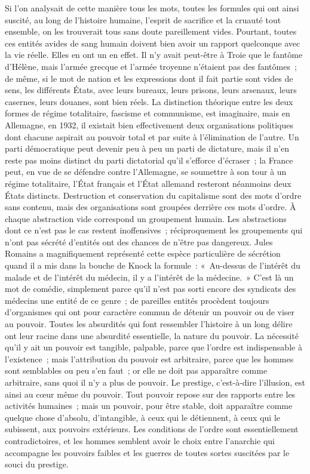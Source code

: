 \documentclass[french,twoside]{book} %
\begin{document}
\noindent Si l'on analysait de cette manière tous les mots, toutes les formules qui ont ainsi suscité, au long de l'histoire humaine, l'esprit de sacrifice et la cruauté tout ensemble, on les trouverait tous sans doute pareillement vides. Pourtant, toutes ces entités avides de sang humain doivent bien avoir un rapport quelconque avec la vie réelle. Elles en ont un en effet. Il n'y avait peut-être à Troie que le fantôme d'Hélène, mais l'armée grecque et l'armée troyenne n'étaient pas des fantômes ; de même, si le mot de nation et les expressions dont il fait partie sont vides de sens, les différents États, avec leurs bureaux, leurs prisons, leurs arsenaux, leurs casernes, leurs douanes, sont bien réels. La distinction théorique entre les deux formes de régime totalitaire, fascisme et communisme, est imaginaire, mais en Allemagne, en 1932, il existait bien effectivement deux organisations politiques dont chacune aspirait au pouvoir total et par suite à l'élimination de l'autre. Un parti démocratique peut devenir peu à peu un parti de dictature, mais il n'en reste pas moins distinct du parti dictatorial qu'il s'efforce d'écraser ; la France peut, en vue de se défendre contre l'Allemagne, se soumettre à son tour à un régime totalitaire, l'État français et l'État allemand resteront néanmoins deux États distincts. Destruc­tion et conservation du capitalisme sont des mots d'ordre sans contenu, mais des organisations sont groupées derrière ces mots d'ordre. À chaque abstrac­tion vide correspond un groupement humain. Les abstractions dont ce n'est pas le cas restent inoffensives ; réciproquement les groupements qui n'ont pas sécrété d'entités ont des chances de n'être pas dangereux. Jules Romains a magnifiquement représenté cette espèce particulière de sécrétion quand il a mis dans la bouche de Knock la formule : « Au-dessus de l'intérêt du malade et de l'intérêt du médecin, il y a l'intérêt de la médecine. » C'est là un mot de comédie, simplement parce qu'il n'est pas sorti encore des syndicats des médecins une entité de ce genre ; de pareilles entités procèdent toujours d'organismes qui ont pour caractère commun de détenir un pouvoir ou de viser au pouvoir. Toutes les absurdités qui font ressembler l'histoire à un long délire ont leur racine dans une absurdité essentielle, la nature du pouvoir. La nécessité qu'il y ait un pouvoir est tangible, palpable, parce que l'ordre est indispensable à l'existence ; mais l'attribution du pouvoir est arbitraire, parce que les hommes sont semblables ou peu s'en faut ; or elle ne doit pas apparaître comme arbitraire, sans quoi il n'y a plus de pouvoir. Le prestige, c'est-à-dire l'illusion, est ainsi au cœur même du pouvoir. Tout pouvoir repose sur des rapports entre les activités humaines ; mais un pouvoir, pour être stable, doit apparaître comme quelque chose d'absolu, d'intangible, à ceux qui le détiennent, à ceux qui le subissent, aux pouvoirs extérieurs. Les conditions de l'ordre sont essentiellement contradictoires, et les hommes semblent avoir le choix entre l'anarchie qui accompagne les pouvoirs faibles et les guerres de toutes sortes suscitées par le souci du prestige.\par
\end{document}
